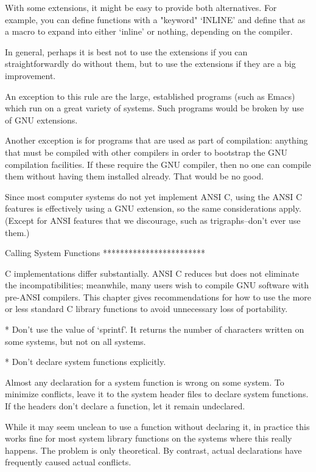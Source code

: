    With some extensions, it might be easy to provide both alternatives.
For example, you can define functions with a "keyword" `INLINE' and
define that as a macro to expand into either `inline' or nothing,
depending on the compiler.

   In general, perhaps it is best not to use the extensions if you can
straightforwardly do without them, but to use the extensions if they
are a big improvement.

   An exception to this rule are the large, established programs (such
as Emacs) which run on a great variety of systems.  Such programs would
be broken by use of GNU extensions.

   Another exception is for programs that are used as part of
compilation: anything that must be compiled with other compilers in
order to bootstrap the GNU compilation facilities.  If these require
the GNU compiler, then no one can compile them without having them
installed already.  That would be no good.

   Since most computer systems do not yet implement ANSI C, using the
ANSI C features is effectively using a GNU extension, so the same
considerations apply.  (Except for ANSI features that we discourage,
such as trigraphs--don't ever use them.)

Calling System Functions
************************

   C implementations differ substantially.  ANSI C reduces but does not
eliminate the incompatibilities; meanwhile, many users wish to compile
GNU software with pre-ANSI compilers.  This chapter gives
recommendations for how to use the more or less standard C library
functions to avoid unnecessary loss of portability.

   * Don't use the value of `sprintf'.  It returns the number of
     characters written on some systems, but not on all systems.

   * Don't declare system functions explicitly.

     Almost any declaration for a system function is wrong on some
     system.  To minimize conflicts, leave it to the system header
     files to declare system functions.  If the headers don't declare a
     function, let it remain undeclared.

     While it may seem unclean to use a function without declaring it,
     in practice this works fine for most system library functions on
     the systems where this really happens.  The problem is only
     theoretical.  By contrast, actual declarations have frequently
     caused actual conflicts.

